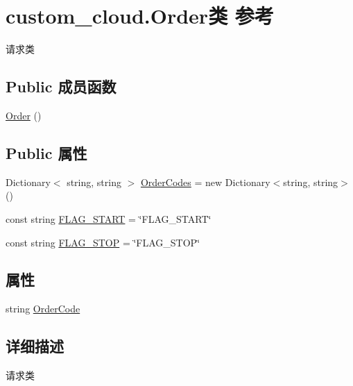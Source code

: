 \hypertarget{classcustom__cloud_1_1_order}{}\section{custom\+\_\+cloud.\+Order类 参考}
\label{classcustom__cloud_1_1_order}


请求类  


\subsection*{Public 成员函数}
\begin{DoxyCompactItemize}
\item 
\hyperlink{classcustom__cloud_1_1_order_acca1d452af0bceb48ef82a9aad8d25ff}{Order} ()
\end{DoxyCompactItemize}
\subsection*{Public 属性}
\begin{DoxyCompactItemize}
\item 
Dictionary$<$ string, string $>$ \hyperlink{classcustom__cloud_1_1_order_aa921c37a11f452a3eb706cbc98eadd47}{Order\+Codes} = new Dictionary$<$string, string$>$()
\item 
const string \hyperlink{classcustom__cloud_1_1_order_a042ce67931003622dce36c5d9393c636}{F\+L\+A\+G\+\_\+\+S\+T\+A\+RT} = \char`\"{}F\+L\+A\+G\+\_\+\+S\+T\+A\+RT\char`\"{}
\item 
const string \hyperlink{classcustom__cloud_1_1_order_a5d43ee5b82c48ca0030a37fa0aae9806}{F\+L\+A\+G\+\_\+\+S\+T\+OP} = \char`\"{}F\+L\+A\+G\+\_\+\+S\+T\+OP\char`\"{}
\end{DoxyCompactItemize}
\subsection*{属性}
\begin{DoxyCompactItemize}
\item 
string \hyperlink{classcustom__cloud_1_1_order_afea2b9669cfbec3d1c98aa7db6ffaa49}{Order\+Code}
\end{DoxyCompactItemize}


\subsection{详细描述}
请求类 



